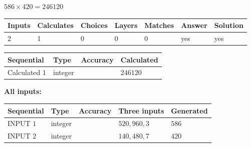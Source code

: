 \documentclass{ctexart}
\begin{document}
 

 
 
 
\noindent{}
 
 

$ %
586 \times  %
420=   %
246120$
 
 
\noindent{}
 
 

 
   
   
   
   
\noindent\begin{tabular}{|l|l|l|l|l|l|l|}
 \hline
Inputs & Calculates & Choices & Layers & Matches & Answer & Solution \\ \hline
 2  & 
 1  & 
 0
  & 
 0  & 
 0  & 
  yes & 
  yes 
  \\ \hline
 \end{tabular}
   
   
   
   
\noindent{}
   
   
  
  
\noindent\begin{tabular}{|l|l|l|l|}
\hline
 Sequential & Type & Accuracy & Calculated \\ 
\hline
 
 
  Calculated $  1 $ & integer &  & 
  $ 246120 $ 
 \\  \hline  
 \end{tabular}
   
   
   
   
\noindent\vspace{0.1in}\hspace{-0.08in} {\textbf{\Large{All inputs: }}}
   
   
  
  
\noindent\begin{tabular}{|l|l|l|l|l|}
\hline
 Sequential & Type & Accuracy & Three inputs & Generated \\ 
\hline
 
 
  INPUT $  1 $ & integer &  & $
 520
 , 
 960
 , 
 3
 $ & $ 586 $ 
 \\  \hline  
 
 
  INPUT $  2 $ & integer &  & $
 140
 , 
 480
 , 
 7
 $ & $ 420 $ 
 \\  \hline  
 \end{tabular}
   
\end{document}
